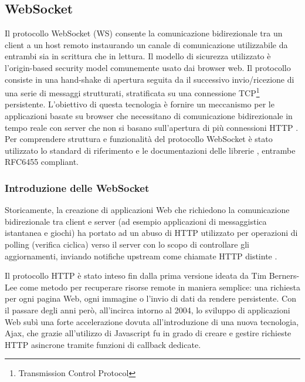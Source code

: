 \subsection{WebSocket}

Il protocollo WebSocket (WS) consente la comunicazione bidirezionale tra un client a un host remoto instaurando un canale di comunicazione utilizzabile da entrambi sia in scrittura che in lettura. Il modello di sicurezza utilizzato è l'origin-based security model comunemente usato dai browser web. Il protocollo consiste in una hand-shake di apertura seguita da il successivo invio/ricezione di una serie di messaggi strutturati, stratificata su una connessione TCP\footnote{Transmission Control Protocol} persistente. L'obiettivo di questa tecnologia è fornire un meccanismo per le applicazioni basate su browser che necessitano di comunicazione bidirezionale in tempo reale con server che non si basano sull'apertura di più connessioni HTTP \cite{RFC6455}.
Per comprendere struttura e funzionalità del protocollo WebSocket è stato utilizzato lo standard di riferimento \cite{RFC6455} e le documentazioni delle librerie \cite{websocket-sharp}\cite{tyrus}, entrambe RFC6455 compliant.

\subsubsection*{Introduzione delle WebSocket}

Storicamente, la creazione di applicazioni Web che richiedono la comunicazione bidirezionale tra client e server (ad esempio applicazioni di messaggistica istantanea e giochi) ha portato ad un abuso di HTTP utilizzato per operazioni di polling (verifica ciclica) verso il server con lo scopo di controllare gli aggiornamenti, inviando notifiche upstream come chiamate HTTP distinte \cite{RFC6202}.

\medskip

Il protocollo HTTP è stato inteso fin dalla prima versione ideata da Tim Berners-Lee come metodo per recuperare risorse remote in maniera semplice: una richiesta per ogni pagina Web, ogni immagine o l’invio di dati da rendere persistente. Con il passare degli anni però, all’incirca intorno al 2004, lo sviluppo di applicazioni Web subì una forte accelerazione dovuta all’introduzione di una nuova tecnologia, Ajax, che grazie all'utilizzo di Javascript fu in grado di creare e gestire richieste HTTP asincrone tramite funzioni di callback dedicate.

\medskip


